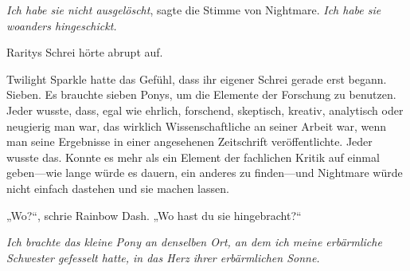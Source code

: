 \emph{Ich habe sie nicht ausgelöscht}, sagte die Stimme von Nightmare. \emph{Ich habe sie woanders hingeschickt.}

Raritys Schrei hörte abrupt auf.

Twilight Sparkle hatte das Gefühl, dass ihr eigener Schrei gerade erst begann. Sieben. Es brauchte sieben Ponys, um die Elemente der Forschung zu benutzen. Jeder wusste, dass, egal wie ehrlich, forschend, skeptisch, kreativ, analytisch oder neugierig man war, das wirklich Wissenschaftliche an seiner Arbeit war, wenn man seine Ergebnisse in einer angesehenen Zeitschrift veröffentlichte. Jeder wusste das. Konnte es mehr als ein Element der fachlichen Kritik auf einmal geben—wie lange würde es dauern, ein anderes zu finden—und Nightmare würde nicht einfach dastehen und sie machen lassen.

„Wo?“, schrie Rainbow Dash.
„Wo hast du sie hingebracht?“

\emph{Ich brachte das kleine Pony an denselben Ort, an dem ich meine erbärmliche Schwester gefesselt hatte, in das Herz ihrer erbärmlichen Sonne.}

